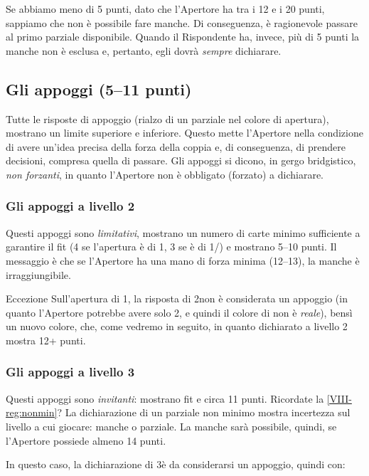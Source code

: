 \documentclass[../corsofiori.tex]{subfiles}
\begin{document}
Se abbiamo meno di 5 punti, dato che l’Apertore ha tra i 12 e i 20 punti, sappiamo che non è possibile fare manche. Di
conseguenza, è ragionevole passare al primo parziale disponibile. Quando il Rispondente ha, invece, più di 5 punti la
manche non è esclusa e, pertanto, egli dovrà \emph{sempre} dichiarare.

\subsection{Gli appoggi (5--11 punti)}

Tutte le risposte di appoggio (rialzo di un parziale nel colore di apertura), mostrano un limite superiore e inferiore.
Questo mette l'Apertore nella condizione di avere un'idea precisa della forza della coppia e, di conseguenza, di
prendere decisioni, compresa quella di passare. Gli appoggi si dicono, in gergo bridgistico, \emph{non forzanti}, in
quanto l'Apertore non è obbligato (forzato) a dichiarare.

\subsubsection{Gli appoggi a livello 2}
Questi appoggi sono \emph{limitativi}, mostrano un numero di carte minimo sufficiente a garantire il fit (4 se
l'apertura è di 1\Di, 3 se è di 1\He/\Sp) e mostrano 5--10 punti. Il messaggio è che se l'Apertore ha una mano di forza
minima (12--13), la manche è irraggiungibile.

\begin{attenzione}{Eccezione}
    Sull'apertura di 1\Cl, la risposta di 2\Cl non è considerata un appoggio (in quanto l’Apertore potrebbe avere solo
    2\Cl, e quindi il colore di \fio non è \emph{reale}), bensì un nuovo colore, che, come vedremo in seguito, in quanto
    dichiarato a livello 2 mostra 12+ punti.
\end{attenzione}

\subsubsection{Gli appoggi a livello 3}
Questi appoggi sono \emph{invitanti}: mostrano fit e circa 11 punti. Ricordate la \autoref{VIII-reg:nonmin}? La
dichiarazione di un parziale non minimo mostra incertezza sul livello a cui giocare: manche o parziale. La manche sarà
possibile, quindi, se l’Apertore possiede almeno 14 punti.

In questo caso, la dichiarazione di 3\Cl è da considerarsi un appoggio, quindi con:
\end{document}
